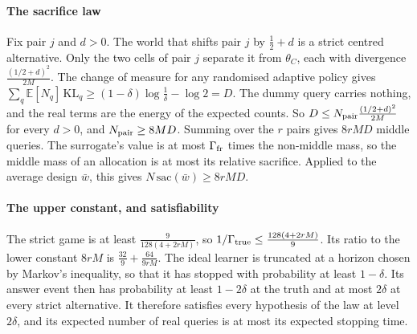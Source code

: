 
\paragraph{The sacrifice law} Fix pair $j$ and $d>0$. The world that shifts pair $j$ by
$\frac12+d$ is a strict centred alternative. Only the two cells of pair $j$ separate it from
$\theta_{C}$, each with divergence $\frac{(1/2+d)^{2}}{2M}$. The change of measure for any
randomised adaptive policy gives
$\sum_{q}\mathbb{E}[N_{q}]\,\mathrm{KL}_{q}\ge(1-\delta)\log\frac1\delta-\log2=D$. The dummy
query carries nothing, and the real terms are the energy of the expected counts. So
$D\le N_{\rm pair}\frac{(1/2+d)^{2}}{2M}$ for every $d>0$, and $N_{\rm pair}\ge8MD$. Summing over
the $r$ pairs gives $8rMD$ middle queries. The surrogate's value is at most $\Gamma_{\rm fr}$
times the non-middle mass, so the middle mass of an allocation is at most its relative
sacrifice. Applied to the average design $\bar w$, this gives $N\,\mathrm{sac}(\bar w)\ge8rMD$.


\paragraph{The upper constant, and satisfiability} The strict game is at least
$\frac{9}{128(4+2rM)}$, so $1/\Gamma_{\rm true}\le\frac{128(4+2rM)}{9}$. Its ratio to the lower
constant $8rM$ is $\frac{32}{9}+\frac{64}{9rM}$. The ideal learner is truncated at a horizon
chosen by Markov's inequality, so that it has stopped with probability at least $1-\delta$. Its
answer event then has probability at least $1-2\delta$ at the truth and at most $2\delta$ at
every strict alternative. It therefore satisfies every hypothesis of the law at level
$2\delta$, and its expected number of real queries is at most its expected stopping time.

